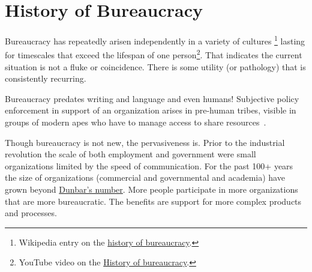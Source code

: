 \section{History of Bureaucracy\label{sec:history}}


Bureaucracy has repeatedly arisen independently in a variety of cultures
\footnote{Wikipedia entry on the \href{https://en.wikipedia.org/wiki/Bureaucracy\%23History}{history of bureaucracy}.}
lasting for timescales that exceed the lifespan of one person\footnote{YouTube video on the \href{https://www.youtube.com/watch?v=B_nsZlcC12g}{History of bureaucracy}.}. That indicates the current situation is not a fluke or coincidence. There is some utility (or pathology) that is consistently recurring. 


Bureaucracy predates writing and language and even humans! Subjective policy enforcement in support of an organization arises in pre-human tribes, visible in groups of modern apes who have to manage access to share resources~\cite{2016_Suchak}. 



Though bureaucracy is not new, the pervasiveness is. Prior to the industrial revolution the scale of both employment and government were small organizations limited by the speed of communication. For the past 100+ years the size of organizations (commercial and governmental and academia) have grown beyond \href{https://en.wikipedia.org/wiki/Dunbar\%27s_number}{Dunbar's number}. More people participate in more organizations that are more bureaucratic. The benefits are support for more complex products and processes. 




